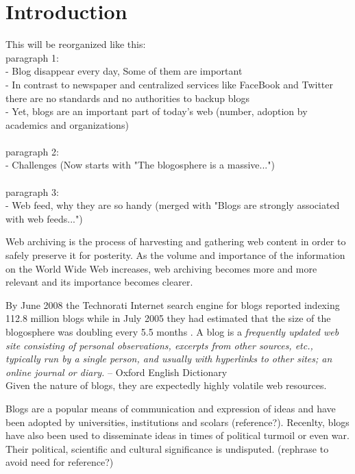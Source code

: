 \section{Introduction}

This will be reorganized like this:\\
paragraph 1:\\
- Blog disappear every day, Some of them are important\\
- In contrast to newspaper and centralized services like FaceBook and Twitter there are no standards and no authorities to backup blogs\\
- Yet, blogs are an important part of today's web (number, adoption by academics and organizations)\\
\\
paragraph 2:\\
- Challenges (Now starts with "The blogosphere is a massive...")\\
\\
paragraph 3:\\
- Web feed, why they are so handy (merged with "Blogs are strongly associated with web feeds...")

Web archiving is the process of harvesting and gathering web content in order to safely preserve it for posterity. As the volume and importance of the information on the World Wide Web increases, web archiving becomes more and more relevant and its importance becomes clearer. 

By June 2008 the Technorati Internet search engine for blogs reported indexing 112.8 million blogs \cite{technoratidata2008} while in July 2005 they had estimated that the size of the blogosphere was doubling every 5.5 months \cite{bloggrowth2005}. A blog is a \emph{frequently updated web site consisting of personal observations, excerpts from other sources, etc., typically run by a single person, and usually with hyperlinks to other sites; an online journal or diary.} -- Oxford English Dictionary\\ Given the nature of blogs, they are expectedly highly volatile web resources.

Blogs are a popular means of communication and expression of ideas and have been adopted by universities, institutions and scolars (reference?). Recenlty, blogs have also been used to disseminate ideas in times of political turmoil or even war\cite{nahedeltantawy2012}. Their political, scientific and cultural significance is undisputed. (rephrase to avoid need for reference?)

